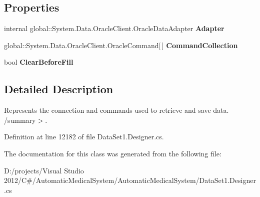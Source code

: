 \subsection*{Properties}
\begin{CompactItemize}
\item 
internal global::System.Data.OracleClient.OracleDataAdapter \textbf{Adapter}\hspace{0.3cm}{\tt  [get]}\label{class_automatic_medical_system_1_1_data_set1_table_adapters_1_1_p_a_t_i_e_n_t_s_table_adapter_5831c536fa1423a6b67adfc0a7629a0c}

\item 
global::System.Data.OracleClient.OracleCommand[$\,$] \textbf{CommandCollection}\hspace{0.3cm}{\tt  [get]}\label{class_automatic_medical_system_1_1_data_set1_table_adapters_1_1_p_a_t_i_e_n_t_s_table_adapter_20c33ad815cd3cafbbdb230b2a4ec100}

\item 
bool \textbf{ClearBeforeFill}\hspace{0.3cm}{\tt  [get, set]}\label{class_automatic_medical_system_1_1_data_set1_table_adapters_1_1_p_a_t_i_e_n_t_s_table_adapter_a5b537a6b7a8f5f9d4b195af4996b677}

\end{CompactItemize}


\subsection{Detailed Description}
Represents the connection and commands used to retrieve and save data. /summary$>$. 

Definition at line 12182 of file DataSet1.Designer.cs.

The documentation for this class was generated from the following file:\begin{CompactItemize}
\item 
D:/projects/Visual Studio 2012/C\#/AutomaticMedicalSystem/AutomaticMedicalSystem/DataSet1.Designer.cs\end{CompactItemize}
